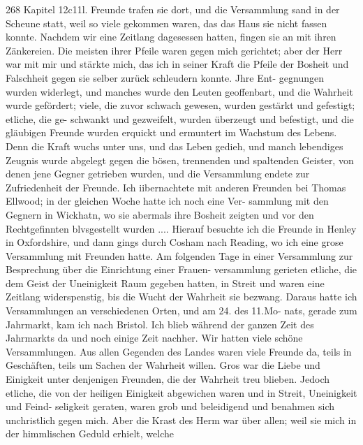 268 Kapitel 12c11l.
Freunde trafen sie dort, und die Versammlung sand in der
Scheune statt, weil so viele gekommen waren, das das Haus sie
nicht fassen konnte. Nachdem wir eine Zeitlang dagesessen hatten,
fingen sie an mit ihren Zänkereien. Die meisten ihrer Pfeile
waren gegen mich gerichtet; aber der Herr war mit mir und
stärkte mich, das ich in seiner Kraft die Pfeile der Bosheit und
Falschheit gegen sie selber zurück schleudern konnte. Jhre Ent-
gegnungen wurden widerlegt, und manches wurde den Leuten
geoffenbart, und die Wahrheit wurde gefördert; viele, die zuvor
schwach gewesen, wurden gestärkt und gefestigt; etliche, die ge-
schwankt und gezweifelt, wurden überzeugt und befestigt, und die
gläubigen Freunde wurden erquickt und ermuntert im Wachstum
des Lebens. Denn die Kraft wuchs unter uns, und das Leben
gedieh, und manch lebendiges Zeugnis wurde abgelegt gegen die
bösen, trennenden und spaltenden Geister, von denen jene Gegner
getrieben wurden, und die Versammlung endete zur Zufriedenheit
der Freunde. Ich iibernachtete mit anderen Freunden bei
Thomas Ellwood; in der gleichen Woche hatte ich noch eine Ver-
sammlung mit den Gegnern in Wickhatn, wo sie abermals ihre
Bosheit zeigten und vor den Rechtgefinnten blvsgestellt wurden ....
Hierauf besuchte ich die Freunde in Henley in Oxfordshire,
und dann gings durch Cosham nach Reading, wo ich eine grose
Versammlung mit Freunden hatte. Am folgenden Tage in einer
Versammlung zur Besprechung über die Einrichtung einer Frauen-
versammlung gerieten etliche, die dem Geist der Uneinigkeit Raum
gegeben hatten, in Streit und waren eine Zeitlang widerspenstig,
bis die Wucht der Wahrheit sie bezwang. Daraus hatte ich
Versammlungen an verschiedenen Orten, und am 24. des 11.Mo-
nats, gerade zum Jahrmarkt, kam ich nach Bristol.
Ich blieb während der ganzen Zeit des Jahrmarkts da und
noch einige Zeit nachher. Wir hatten viele schöne Versammlungen.
Aus allen Gegenden des Landes waren viele Freunde da, teils
in Geschäften, teils um Sachen der Wahrheit willen. Gros war
die Liebe und Einigkeit unter denjenigen Freunden, die der
Wahrheit treu blieben. Jedoch etliche, die von der heiligen
Einigkeit abgewichen waren und in Streit, Uneinigkeit und Feind-
seligkeit geraten, waren grob und beleidigend und benahmen sich
unchristlich gegen mich. Aber die Krast des Herm war über
allen; weil sie mich in der himmlischen Geduld erhielt, welche


